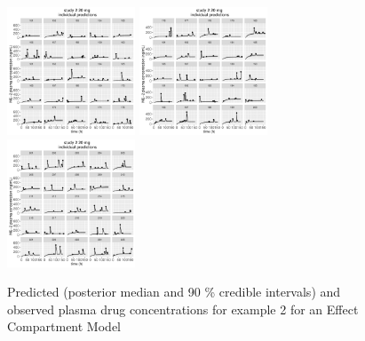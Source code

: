 \documentclass[10pt, reqno, oneside]{amsbook}
\numberwithin{equation}{chapter}
\numberwithin{figure}{chapter}
\numberwithin{table}{chapter}
\theoremstyle{remark}
\begin{document}
\begin{figure}[!htb]
  \includegraphics[width=1.5in,trim=0in 0in 0 0in]{graphics/effCptModelTorsten_0.82/effCptPlots020.pdf}
  \includegraphics[width=1.5in,trim=0in 0in 0 0in]{graphics/effCptModelTorsten_0.82/effCptPlots021.pdf}
  \includegraphics[width=1.5in,trim=0in 0in 0 0in]{graphics/effCptModelTorsten_0.82/effCptPlots022.pdf}
  \caption{{Predicted (posterior median and 90 \% credible intervals) and observed plasma drug concentrations for example 2 for an Effect Compartment Model}}
  \label{effCptModelPredictionsPK}
\end{figure}
\end{document}
